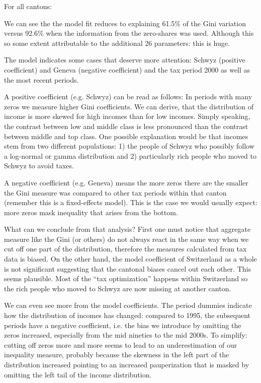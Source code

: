 \documentclass[twoside]{article}\usepackage[]{graphicx}\usepackage[]{color}
\begin{document}
\begin{multicols}{2}
For all cantons:




We can see the the model fit reduces to explaining 61.5\% of the Gini variation versus 92.6\% when the information from the zero-shares was used. Although this so some extent attributable to the additional 26 parameters: this is huge. 

The model indicates some cases that deserve more attention: Schwyz (positive coefficient) and Geneva (negative coefficient) and the tax period 2000 as well as the most recent periods.

A positive coefficient (e.g. Schwyz) can be read as follows: In periods with many zeros we measure higher Gini coefficients. We can derive, that the distribution of income is more skewed for high incomes than for low incomes. Simply speaking, the contrast between low and middle class is less pronounced than the contrast between middle and top class. One possible explanation would be that incomes stem from two different populations: 1) the people of Schwyz who possibly follow a log-normal or gamma distribution and 2) particularly rich people who moved to Schwyz to avoid taxes. 

A negative coefficient (e.g. Geneva) means the more zeros there are the smaller the Gini measure was compared to other tax periods within that canton (remember this is a fixed-effects model). This is the case we would usually expect: more zeros mask inequality that arises from the bottom.

What can we conclude from that analysis? First one must notice that aggregate measure like the Gini (or others) do not always react in the same way when we cut off one part of the distribution, therefore the measures calculated from tax data is biased. On the other hand, the model coefficient of Switzerland as a whole is not significant suggesting that the cantonal biases cancel out each other. This seems plausible. Most of the ``tax optimization'' happens within Switzerland so the rich people who moved to Schwyz are now missing at another canton.

We can even see more from the model coefficients. The period dummies indicate how the distribution of incomes has changed: compared to 1995, the subsequent periods have a negative coefficient, i.e. the bias we introduce by omitting the zeros increased, especially from the mid nineties to the mid 2000s. To simplify: cutting off zeros more and more seems to lead to an underestimation of our inequality measure, probably because the skewness in the left part of the distribution increased pointing to an increased pauperization that is masked by omitting the left tail of the income distribution.





\end{multicols}
\end{document}

